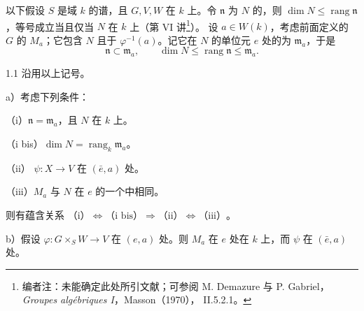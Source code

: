以下假设 $S$ 是域 $k$ 的谱，且 $G,V,W$ 在 $k$ 上。令 $\mathfrak n$ 为 $N$ 的，则 $\dim N\leq\operatorname{rang}\mathfrak n$，等号成立当且仅当 $N$ 在 $k$ 上（第 VI 讲\footnote{编者注：未能确定此处所引文献；可参阅 M. Demazure 与 P. Gabriel，\textit{Groupes algébriques I}，Masson（1970）， II.5.2.1。}）。
设 $a\in W(k)$，考虑前面定义的 $G$ 的 $M_a$；它包含 $N$ 且于 $\varphi^{-1}(a)$。记它在 $N$ 的单位元 $e$ 处的为 $\mathfrak m_a$，于是
\[\mathfrak n\subset\mathfrak m_a,\qquad \dim N\leq\operatorname{rang}\mathfrak n\leq\mathfrak m_a.\tag{1}\]
\begin{SGAresult}{}{1.1}
沿用以上记号。

 a）考虑下列条件：

（i）$\mathfrak n=\mathfrak m_a$，且 $N$ 在 $k$ 上。

（i bis）$\dim N=\operatorname{rang}_k\mathfrak m_a$。

（ii） $\psi:X\to V$ 在 $(\bar e,a)$ 处。

（iii）$M_a$ 与 $N$ 在 $e$ 的一个中相同。

则有蕴含关系 $\text{（i）}\Leftrightarrow\text{（i bis）}\Rightarrow\text{（ii）}\Leftrightarrow\text{（iii）}$。

 b）假设 $\varphi:G\times_S W\to V$ 在 $(e,a)$ 处。则 $M_a$ 在 $e$ 处在 $k$ 上，而 $\psi$ 在 $(\bar e,a)$ 处。
\end{SGAresult}
